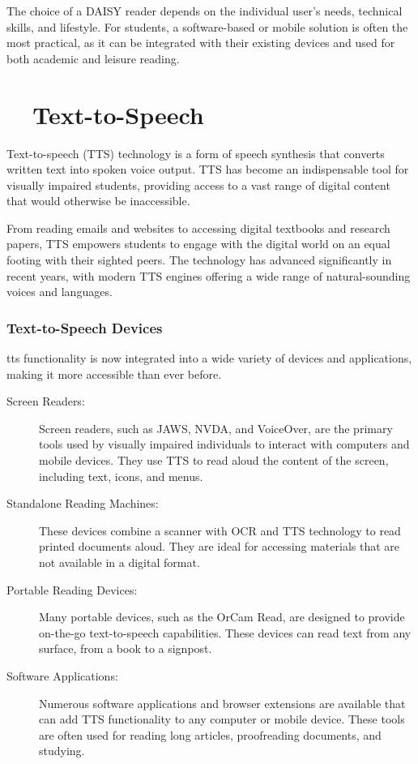 The choice of a DAISY reader depends on the individual user's needs, technical skills, and lifestyle. For students, a software-based or mobile solution is often the most practical, as it can be integrated with their existing devices and used for both academic and leisure reading.\supercite{VoiceDreamReader, Bookshare}

\section{~~Text-to-Speech}

Text-to-speech (TTS) technology is a form of speech synthesis that converts written text into spoken voice output. TTS has become an indispensable tool for visually impaired students, providing access to a vast range of digital content that would otherwise be inaccessible.\supercite{VisionAid2025, Speechify2025}

From reading emails and websites to accessing digital textbooks and research papers, TTS empowers students to engage with the digital world on an equal footing with their sighted peers. The technology has advanced significantly in recent years, with modern TTS engines offering a wide range of natural-sounding voices and languages.\supercite{Respeecher2024}

\subsubsection{Text-to-Speech Devices}

\gls{tts} functionality is now integrated into a wide variety of devices and applications, making it more accessible than ever before.

\begin{description}
	\item[Screen Readers:] Screen readers, such as JAWS, NVDA, and VoiceOver, are the primary tools used by visually impaired individuals to interact with computers and mobile devices. They use TTS to read aloud the content of the screen, including text, icons, and menus.
	\item[Standalone Reading Machines:] These devices combine a scanner with OCR and TTS technology to read printed documents aloud. They are ideal for accessing materials that are not available in a digital format.
	\item[Portable Reading Devices:] Many portable devices, such as the OrCam Read, are designed to provide on-the-go text-to-speech capabilities. These devices can read text from any surface, from a book to a signpost.
	\item[Software Applications:] Numerous software applications and browser extensions are available that can add TTS functionality to any computer or mobile device. These tools are often used for reading long articles, proofreading documents, and studying.
\end{description}

